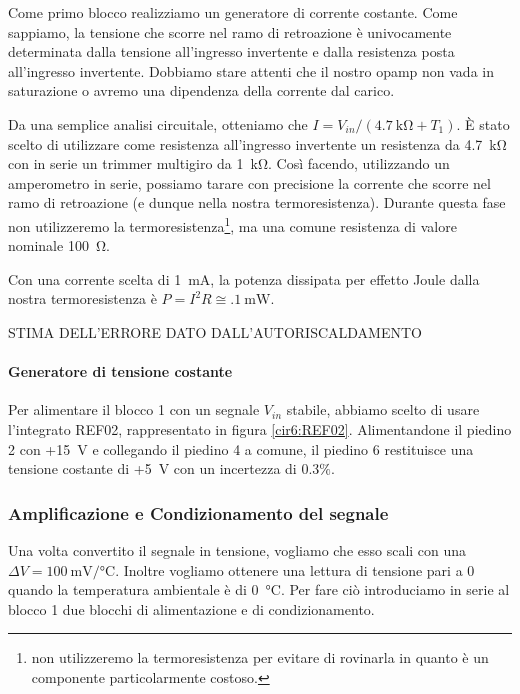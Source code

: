 Come primo blocco realizziamo un generatore di corrente costante.
Come sappiamo, la tensione che scorre nel ramo di retroazione è univocamente determinata dalla tensione all'ingresso invertente e dalla resistenza posta all'ingresso invertente.
Dobbiamo stare attenti che il nostro opamp non vada in saturazione o avremo una dipendenza della corrente dal carico.

Da una semplice analisi circuitale, otteniamo che $I=V_{in}/(\SI{4.7}{\kohm}+T_1)$.
È stato scelto di utilizzare come resistenza all'ingresso invertente un resistenza da \SI{4.7}{\kilo\ohm} con in serie un trimmer multigiro da \SI{1}{\kilo\ohm}.
Così facendo, utilizzando un amperometro in serie, possiamo tarare con precisione la corrente che scorre nel ramo di retroazione (e dunque nella nostra termoresistenza).
Durante questa fase non utilizzeremo la termoresistenza\footnote{non utilizzeremo la termoresistenza per evitare di rovinarla in quanto è un componente particolarmente costoso.}, ma una comune resistenza di valore nominale \SI{100}{\ohm}.

Con una corrente scelta di \SI{1}{\milli\ampere}, la potenza dissipata per effetto Joule dalla nostra termoresistenza è $P=I^2 R \cong \SI{.1}{\mW}$.

STIMA DELL'ERRORE DATO DALL'AUTORISCALDAMENTO

\paragraph{Generatore di tensione costante\newline}

Per alimentare il blocco 1 con un segnale $V_{in}$ stabile, abbiamo scelto di usare l'integrato REF02, rappresentato in figura \ref{cir6:REF02}.
Alimentandone il piedino 2 con +\SI{15}{\volt} e collegando il piedino 4 a comune, il piedino 6 restituisce una tensione costante di +\SI{5}{\volt} con un incertezza di \num{0.3}$\%$.
\newpage

\subsubsection{Amplificazione e Condizionamento del segnale}
Una volta convertito il segnale in tensione, vogliamo che esso scali con una $\Delta V=\SI{100}{\milli\volt}/\si{\celsius}$.
Inoltre vogliamo ottenere una lettura di tensione pari a \num{0} quando la temperatura ambientale è di \SI{0}{\celsius}.
Per fare ciò introduciamo in serie al blocco 1 due blocchi di alimentazione e di condizionamento.

